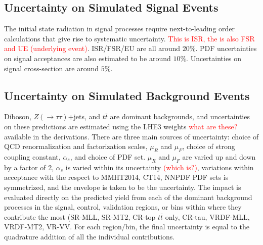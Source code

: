 \subsection{Uncertainty on Simulated Signal Events}
The initial state radiation in signal processes require next-to-leading order calculations that give rise to systematic uncertainty. \textcolor{red}{This is ISR, the is also FSR and UE (underlying event)}. ISR/FSR/EU are all around $20\%$.  PDF uncertainties on signal acceptances are also estimated to be around $10\%$.  Uncertainties on signal cross-section are around $5\%$.

\subsection{Uncertainty on Simulated Background Events}
Diboson, $Z(\rightarrow\tau\tau)$+jets, and $t\bar{t}$ are dominant backgrounds, and uncertainties on these predictions are estimated using the LHE3 weights \textcolor{red}{what are these?} available in the derivations.  There are three main sources of uncertainty: choice of QCD renormalization and factorization scales, $\mu_R$ and $\mu_F$, choice of strong coupling constant, $\alpha_s$, and choice of PDF set.  $\mu_R$ and $\mu_F$ are varied up and down by a factor of 2, $\alpha_s$ is varied within its uncertainty \textcolor{red}{(which is?)}, variations within acceptance with the respect to MMHT2014, CT14, NNPDF PDF sets is symmetrized, and the envelope is taken to be the uncertainty.  The impact is evaluated directly on the predicted yield from each of the dominant background processes in the signal, control, validation regions, or bins within where they contribute the most (SR-MLL, SR-MT2, CR-top $t\bar{t}$ only, CR-tau, VRDF-MLL, VRDF-MT2, VR-VV.  For each region/bin, the final uncertainty is equal to the quadrature addition of all the individual contributions.

